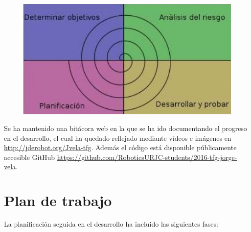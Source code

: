 \begin{figure}[H]
	\centering
		\includegraphics{imgs/metodologia-espiral.jpg}
	\label{fig:Desarrollo en espiral}
\end{figure}

\hspace{1 cm} Se ha mantenido una bit\'acora web en la que se ha ido documentando el progreso en el desarrollo, el cual ha quedado reflejado mediante v\'ideos e im\'agenes en \href{http://jderobot.org/Jvela-tfg}{http://jderobot.org/Jvela-tfg}. Adem\'as el c\'odigo est\'a disponible p\'ublicamente accesible GitHub \href{https://github.com/RoboticsURJC-students/2016-tfg-jorge-vela}{https://github.com/RoboticsURJC-students/2016-tfg-jorge-vela}.


\section{Plan de trabajo}
La planificaci\'on seguida en el desarrollo ha incluido las siguientes fases:

